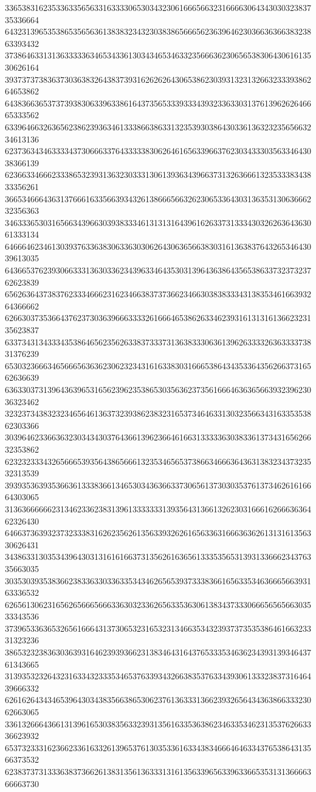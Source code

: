 33653831623533633565633163333065303432306166656632316666306434303032383735336664
64323139653538653565636138383234323038386566656236396462303663636638323863393432
37386463313136333336346534336130343465346332356663623065653830643061613530626164
39373737383637303638326438373931626262643065386230393132313266323339386264653862
64383663653737393830633963386164373565333933343932336330313761396262646665333562
63396466326365623862393634613338663863313235393038643033613632323565663234613136
62373634346333343730666337643333383062646165633966376230343330356334643038366139
62366334666233386532393136323033313061393634396637313263666132353338343833356261
36653466643631376661633566393432613866656632623065336430313635313063666232356363
34633365303165663439663039383334613131316439616263373133343032626364363061333134
64666462346130393763363830633630306264306365663830316136383764326534643039613035
64366537623930663331363033623439633464353031396436386435653863373237323762623839
65626364373837623334666231623466383737366234663038383334313835346166393264366662
62663037353664376237303639666333326166646538626334623931613131613662323135623837
63373431343334353864656235626338373337313638333063613962633332636333373831376239
65303236663465666563636230623234316163383031666538643435336435626637316562636639
63633037313964363965316562396235386530356362373561666463636566393239623036323462
32323734383232346564613637323938623832316537346463313032356634316335353862303366
30396462336636323034343037643661396236646166313333363038336137343165626632353862
62323233343265666539356438656661323534656537386634666364363138323437323532313539
39393536393536636133383661346530343636633730656137303035376137346261616664303065
31363666666231346233623831396133333331393564313661326230316661626663636462326430
64663736393237323338316262356261356339326261656336316663636261313161356330626431
34386331303534396430313161616637313562616365613335356531393133666234376335663035
30353039353836623833633033633534346265653937333836616563353463666566393163336532
62656130623165626566656663363032336265633536306138343733306665656566303533343536
37396533636532656166643137306532316532313466353432393737353538646166323331323236
38653232383630363931646239393662313834643164376533353463623439313934643761343665
31393532326432316334323335346537633934326638353763343930613332383731646439666332
62616264343465396430343835663865306237613633313662393265643436386633323062663065
33613266643661313961653038356332393135616335363862346335346231353762663336623932
65373233316236623361633261396537613035336163343834666464633437653864313566373532
62383737313336383736626138313561363331316135633965633963366535313136666366663730
